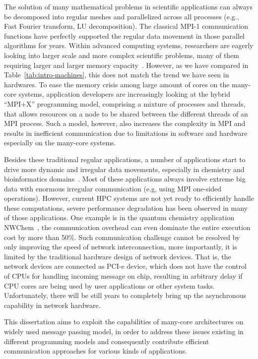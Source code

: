 The solution of many mathematical problems in scientific applications
can always be decomposed into regular meshes and parallelized across all
processes (e.g., Fast Fourier transform, LU decomposition). The classical
MPI-1 communication functions have perfectly supported the regular data
movement in those parallel algorithms for years.
Within advanced computing systems, researchers are eagerly looking into
larger scale and more complex scientific problems, many of them requiring
larger and larger memory capacity~\cite{qmcpack}. However, as we have
compared in Table~\ref{tab:intro-machines}, this does not match the trend
we have seen in hardwares. To ease the memory crisis among large amount of
cores on the many-core systems, application developers are increasingly
looking at the hybrid ``MPI+X'' programming model, comprising a mixture
of processes and threads, that allows resources on a node to be shared
between the different threads of an MPI process. Such a model, however,
also increases the complexity in MPI and results in inefficient communication
due to limitations in software and hardware especially on the many-core
systems.

Besides these traditional regular applications, a number of applications
start to drive more dynamic and irregular data movements, especially
in chemistry and bioinformatics domains~\cite{gfmc,swap,nwchem}. Most of these applications
always involve extreme big data with enormous irregular communication
(e.g, using MPI one-sided operations). However, current HPC systems
are not yet ready to efficiently handle these computations, severe
performance degradation has been observed in many of those applications.
One example is in the quantum chemistry application NWChem~\cite{nwchem},
the communication overhead can even dominate the entire execution cost
by more than 50\%. Such communication challenge cannot be resolved by
only improving the speed of network interconnection, more importantly,
it is limited by the traditional hardware design of network devices.
That is, the network devices are connected as PCI-e device, which does
not have the control of CPUs for handling incoming message on chip,
resulting in arbitrary delay if CPU cores are being used by user
applications or other system tasks. Unfortunately, there will be still
years to completely bring up the asynchronous capability in network
hardware.

This dissertation aims to exploit the capabilities of many-core
architectures on widely used message passing model, in order to address
these issues existing in different programming models and consequently
contribute efficient communication approaches for various kinds of
applications.

